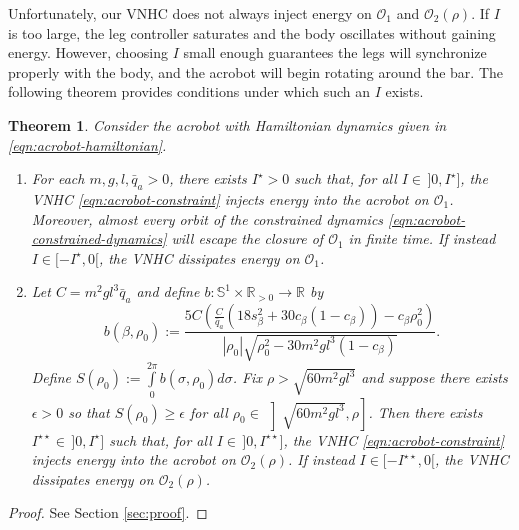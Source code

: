 \documentclass[journal,twoside,web, twocolumn,draftcls]{ieeecolor}
\newtheorem{thm}{Theorem}%
\newcommand*{\R}{\mathbb{R}}
\newcommand*{\Sone}{\mathbb{S}^1}
\newcommand*{\SxR}{\Sone \times \R}
\begin{document}
Unfortunately, our VNHC does not always inject energy on \(\mathcal{O}_1\) and
\(\mathcal{O}_2(\rho)\).
If \(I\) is too large, the leg controller saturates and the body oscillates
without gaining energy.
However, choosing \(I\) small enough guarantees the legs will synchronize
properly with the body, and the acrobot will begin rotating around the bar.
The following theorem provides conditions under which such an \(I\) exists.

\begin{thm}\label{thm:acrobot-energy-stabilization}
    Consider the acrobot with Hamiltonian dynamics given in
    \eqref{eqn:acrobot-hamiltonian}.
\begin{enumerate}
    \item For each \(m, g, l, \bar{q}_a > 0\), there exists
        \(I^\star > 0\) such that, for all \(I \in \, ]0,I^\star]\), the VNHC
        \eqref{eqn:acrobot-constraint} injects energy into the acrobot on
        \(\mathcal{O}_1\).
        Moreover, almost every orbit of the constrained dynamics 
        \eqref{eqn:acrobot-constrained-dynamics} will escape the closure of
        \(\mathcal{O}_1\) in finite time.
        If instead \(I \in [-I^\star,0[\), the VNHC dissipates energy
        on \(\mathcal{O}_1\).
    \item Let \(C = m^2gl^3\bar{q}_a\) and 
        define \(b : \SxR_{> 0} \rightarrow \R\) by
    \[
        b(\beta,\rho_0) := 
        \frac{5C \left(
        \frac{C}{\bar{q}_a}\left(18s_\beta^2 + 30c_\beta(1 - c_\beta)\right)
            - c_\beta\rho_0^2
        \right)}{
        |\rho_0|\sqrt{\rho_0^2 - 30m^2gl^3(1 - c_\beta)}
        }
        .
    \]
        Define 
        \(S(\rho_0) := \int \limits_{0}^{2\pi} b(\sigma,\rho_0)d\sigma\).
        Fix \(\rho > \sqrt{60m^2gl^3}\) and
        suppose there exists \(\epsilon > 0\) so that 
        \(S(\rho_0) \geq \epsilon\) for all 
        \(\rho_0 \in \, \left]\sqrt{60m^2gl^3}, \rho\right]\).
        Then there exists \(I^{\star\star} \in \, ]0, I^\star]\) such that, for all 
        \(I \in \, ]0,I^{\star\star}]\), the VNHC
        \eqref{eqn:acrobot-constraint} injects energy into the acrobot on
        \(\mathcal{O}_2(\rho)\).
        If instead \(I \in [-I^{\star\star},0[\), the VNHC dissipates energy
        on \(\mathcal{O}_2(\rho)\).
\end{enumerate}
\end{thm}
\begin{proof}
    See Section \ref{sec:proof}.
\end{proof}
\end{document}
